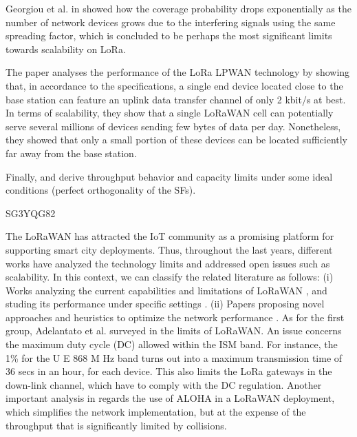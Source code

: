 Georgiou et al.
in \cite{georgiou_low_2017} showed how the coverage probability drops exponentially as the number of network devices grows due to the interfering signals using the same spreading factor,
	which is concluded to be perhaps the most significant limits towards scalability on LoRa.

The paper \cite{mikhaylov_analysis_2016} analyses the performance of the LoRa LPWAN technology by showing that,
	in accordance to the specifications,
	a single end device located close to the base station can feature an uplink data transfer channel of only 2 kbit/s at best.
In terms of scalability,
	they show that a single LoRaWAN cell can potentially serve several millions of devices sending few bytes of data per day.
Nonetheless,
	they showed that only a small portion of these devices can be located sufficiently far away from the base station.

Finally,
	\cite{reynders_power_2017} and \cite{magrin_performance_2017} derive throughput behavior and capacity limits under some ideal conditions (perfect orthogonality of the SFs).

\cite{cuomo_towards_2018} SG3YQG82

The LoRaWAN has attracted the IoT community as a promising platform for supporting smart city deployments.
Thus,
	throughout the last years,
	different works have analyzed the technology limits and addressed open issues such as scalability.
In this context,
	we can classify the related literature as follows:
	(i) Works analyzing the current capabilities and limitations of LoRaWAN \cite{adelantado_understanding_2017}\cite{petajajarvi_performance_2017}\cite{georgiou_low_2017}\cite{bor_lora_2016},
	and studing its performance under specific settings \cite{magrin_performance_2017}\cite{petajajarvi_evaluation_2017}\cite{varsier_capacity_2017}.
(ii) Papers proposing novel approaches and heuristics to optimize the network performance \cite{bor_lora_nodate}\cite{reynders_power_2017}\cite{abdelfadeel_fair_2018}\cite{sartori_enabling_2017}\cite{cuomo_explora_2017}.
As for the first group,
	Adelantato et al.
surveyed in \cite{adelantado_understanding_2017} the limits of LoRaWAN.
An issue concerns the maximum duty cycle (DC) allowed within the ISM band.
For instance,
	the 1\% for the U E 868 M Hz band turns out into a maximum
transmission time of 36 secs in an hour,
	for each device.
This also limits the LoRa gateways in the down-link channel,
	which have to comply with the DC regulation.
Another important analysis in \cite{adelantado_understanding_2017} regards the use of ALOHA in a LoRaWAN deployment,
	which simplifies the network implementation,
	but at the expense of the throughput that is significantly limited by collisions.

